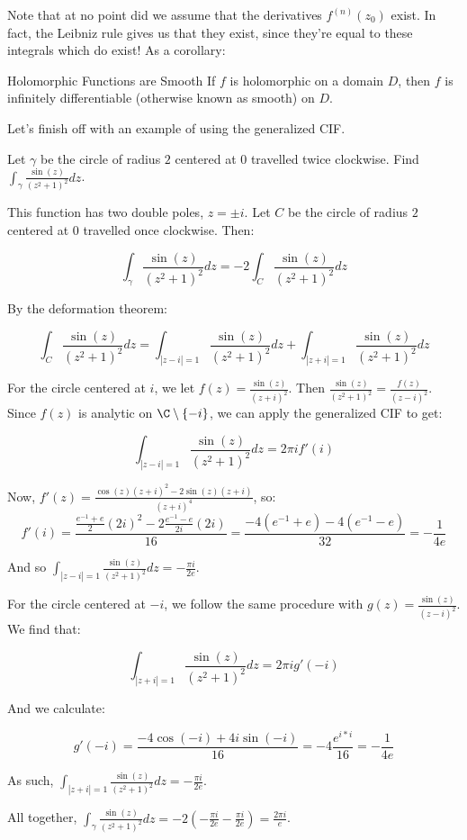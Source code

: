 Note that at no point did we assume that the derivatives $f^{(n)}(z_0)$ exist. In fact, the Leibniz rule gives us that they exist, since they're equal to these integrals which do exist! As a corollary:

\begin{corbo}{Holomorphic Functions are Smooth}{}
If $f$ is holomorphic on a domain $D$, then $f$ is infinitely differentiable (otherwise known as smooth) on $D$.
\end{corbo}

Let's finish off with an example of using the generalized CIF.

\begin{ex}{}{} Let $\gamma$ be the circle of radius $2$ centered at $0$ travelled twice clockwise. Find $\int_{\gamma} \frac{\sin(z)}{(z^2+1)^2}dz$.

This function has two double poles, $z = \pm i$. Let $C$ be the circle of radius $2$ centered at $0$ travelled once clockwise. Then:

$$\int_{\gamma} \frac{\sin(z)}{(z^2+1)^2}dz = -2\int_{C}\frac{\sin(z)}{(z^2+1)^2}dz$$

By the deformation theorem:

$$\int_{C} \frac{\sin(z)}{(z^2+1)^2} dz = \int_{|z-i|=1} \frac{\sin(z)}{(z^2+1)^2}dz + \int_{|z+i|=1} \frac{\sin(z)}{(z^2+1)^2}dz$$

For the circle centered at $i$, we let $f(z) = \frac{\sin(z)}{(z+i)^2}$. Then $\frac{\sin(z)}{(z^2+1)^2} = \frac{f(z)}{(z-i)^2}$. Since $f(z)$ is analytic on $\C\setminus\{-i\}$, we can apply the generalized CIF to get:

$$\int_{|z-i|=1} \frac{\sin(z)}{(z^2+1)^2} dz = 2\pi i f'(i)$$

Now, $f'(z) = \frac{\cos(z)(z+i)^2 - 2\sin(z)(z+i)}{(z+i)^4}$, so: 
$$f'(i) = \frac{\frac{e^{-1} + e}{2}(2i)^2 - 2\frac{e^{-1} - e}{2i}(2i)}{16} = \frac{-4(e^{-1} + e) - 4(e^{-1} - e)}{32} = -\frac{1}{4e}$$

And so $\int_{|z-i|=1}\frac{\sin(z)}{(z^2+1)^2}dz = -\frac{\pi i }{2e}$.

For the circle centered at $-i$, we follow the same procedure with $g(z) = \frac{\sin(z)}{(z-i)^2}$. We find that:

$$\int_{|z+i|=1} \frac{\sin(z)}{(z^2+1)^2}dz = 2\pi i g'(-i)$$

And we calculate:

$$g'(-i) = \frac{-4\cos(-i) + 4i\sin(-i)}{16} = -4\frac{e^{i*i}}{16} = -\frac{1}{4e}$$

As such, $\int_{|z+i|=1}\frac{\sin(z)}{(z^2+1)^2}dz = -\frac{\pi i }{2e}$.

All together, $\int_{\gamma} \frac{\sin(z)}{(z^2+1)^2}dz = -2(-\frac{\pi i }{2e} -\frac{\pi i }{2e}) = \frac{2\pi i }{e} $.
\end{ex}